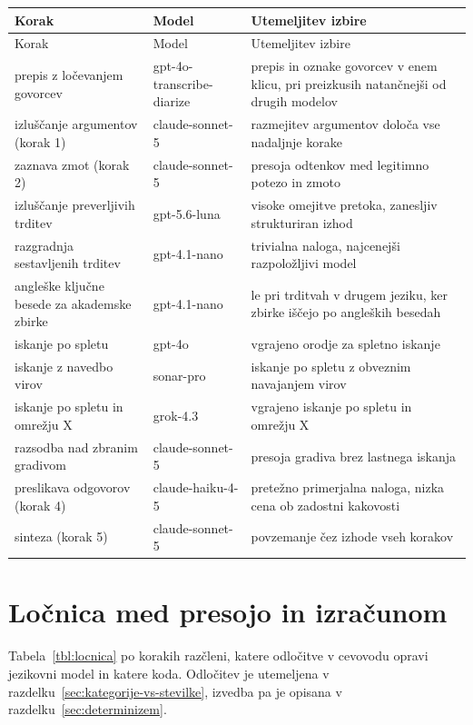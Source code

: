 \documentclass[a4paper, 12pt]{book}
\begin{document}
\begingroup
\small
{}
\begin{longtable}{@{}p{}p{}p{}@{}}
\label{tbl:modeli}\\
\toprule
Korak & Model & Utemeljitev izbire \\
\midrule
\endfirsthead
\toprule
Korak & Model & Utemeljitev izbire \\
\midrule
\endhead
\bottomrule
\endfoot
prepis z ločevanjem govorcev & gpt-4o-transcribe-diarize & prepis in oznake govorcev v enem klicu, pri preizkusih natančnejši od drugih modelov \\
izluščanje argumentov (korak 1) & claude-sonnet-5 & razmejitev argumentov določa vse nadaljnje korake \\
zaznava zmot (korak 2) & claude-sonnet-5 & presoja odtenkov med legitimno potezo in zmoto \\
izluščanje preverljivih trditev & gpt-5.6-luna & visoke omejitve pretoka, zanesljiv strukturiran izhod \\
razgradnja sestavljenih trditev & gpt-4.1-nano & trivialna naloga, najcenejši razpoložljivi model \\
angleške ključne besede za akademske zbirke & gpt-4.1-nano & le pri trditvah v drugem jeziku, ker zbirke iščejo po angleških besedah \\
iskanje po spletu & gpt-4o & vgrajeno orodje za spletno iskanje \\
iskanje z navedbo virov & sonar-pro & iskanje po spletu z obveznim navajanjem virov \\
iskanje po spletu in omrežju X & grok-4.3 & vgrajeno iskanje po spletu in omrežju X \\
razsodba nad zbranim gradivom & claude-sonnet-5 & presoja gradiva brez lastnega iskanja \\
preslikava odgovorov (korak 4) & claude-haiku-4-5 & pretežno primerjalna naloga, nizka cena ob zadostni kakovosti \\
sinteza (korak 5) & claude-sonnet-5 & povzemanje čez izhode vseh korakov \\
\end{longtable}
\endgroup

\chapter{Ločnica med presojo in izračunom}
\label{app:locnica}

Tabela~\ref{tbl:locnica} po korakih razčleni, katere odločitve v cevovodu opravi
jezikovni model in katere koda. Odločitev je utemeljena v
razdelku~\ref{sec:kategorije-vs-stevilke}, izvedba pa je opisana v
razdelku~\ref{sec:determinizem}.
\end{document}
